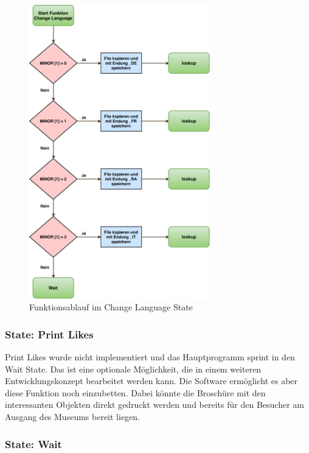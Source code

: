 \begin{figure}[htbp!!!!]
	\centering
	\includegraphics[width=0.7\textwidth]{Data/ChangeLanguage_picture.pdf}
	\caption[Statemachine: Change Language]{Funktionsablauf im Change Language State}
	\label{fig:changeLanguageState}
\end{figure} 

\subsubsection*{State: Print \glqq Likes \grqq}

Print \glqq Likes \grqq wurde nicht implementiert und das Hauptprogramm sprint in den Wait State. Das ist eine optionale Möglichkeit, die in einem weiteren Entwicklungskonzept bearbeitet werden kann. Die Software ermöglicht es aber diese Funktion noch einzubetten. Dabei könnte die Broschüre mit den interessanten Objekten direkt gedruckt werden und bereits für den Besucher am Ausgang des Museums bereit liegen.

\subsubsection*{State: Wait}

